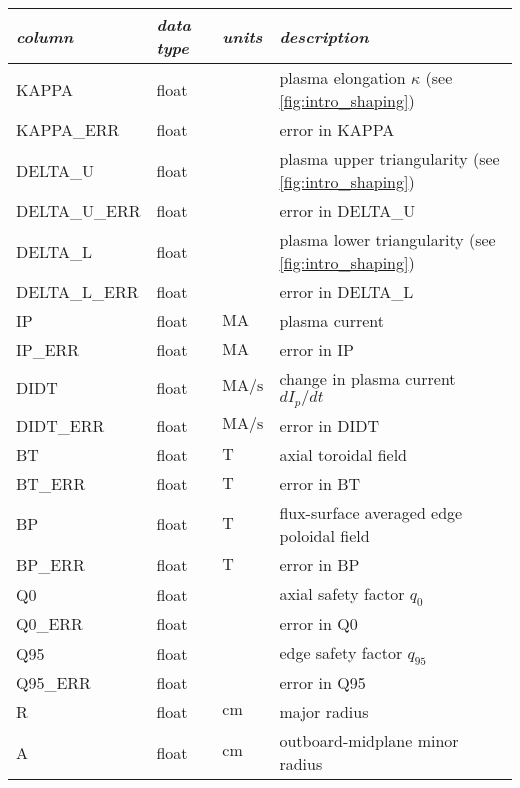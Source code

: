 \begin{table*}[h]
 \pushtooutside
 {\begin{tabu} to 143mm {X[2.348,l]X[1,c]X[1,c]X[4.348,c]}
   \toprule
   \emph{column} &
   \emph{data type} &
   \emph{units} &
   \emph{description}
   \\
   \midrule
   KAPPA &
   float &
   &
   plasma elongation $\kappa$ (see \cref{fig:intro_shaping})
   \\
   KAPPA\_ERR &
   float &
   &
   error in KAPPA
   \\
   DELTA\_U &
   float &
   &
   plasma upper triangularity (see \cref{fig:intro_shaping})
   \\
   DELTA\_U\_ERR &
   float &
   &
   error in DELTA\_U
   \\
   DELTA\_L &
   float &
   &
   plasma lower triangularity (see \cref{fig:intro_shaping})
   \\
   DELTA\_L\_ERR &
   float &
   &
   error in DELTA\_L
   \\
   IP &
   float &
   $\si{\mega\ampere}$ &
   plasma current
   \\
   IP\_ERR &
   float &
   $\si{\mega\ampere}$ &
   error in IP
   \\
   DIDT &
   float &
   $\si{\mega\ampere\per\second}$ &
   change in plasma current $dI_p/dt$
   \\
   DIDT\_ERR &
   float &
   $\si{\mega\ampere\per\second}$ &
   error in DIDT
   \\
   BT &
   float &
   $\si{\tesla}$ &
   axial toroidal field
   \\
   BT\_ERR &
   float &
   $\si{\tesla}$ &
   error in BT
   \\
   BP &
   float &
   $\si{\tesla}$ &
   flux-surface averaged edge poloidal field
   \\
   BP\_ERR &
   float &
   $\si{\tesla}$ &
   error in BP
   \\
   Q0 &
   float &
   &
   axial safety factor $q_0$
   \\
   Q0\_ERR &
   float &
   &
   error in Q0
   \\
   Q95 &
   float &
   &
   edge safety factor $q_{95}$
   \\
   Q95\_ERR &
   float &
   &
   error in Q95
   \\
   R &
   float &
   $\si{\centi\meter}$ &
   major radius
   \\
   A &
   float &
   $\si{\centi\meter}$ &
   outboard-midplane minor radius

\end{tabu}}
\end{table*}
